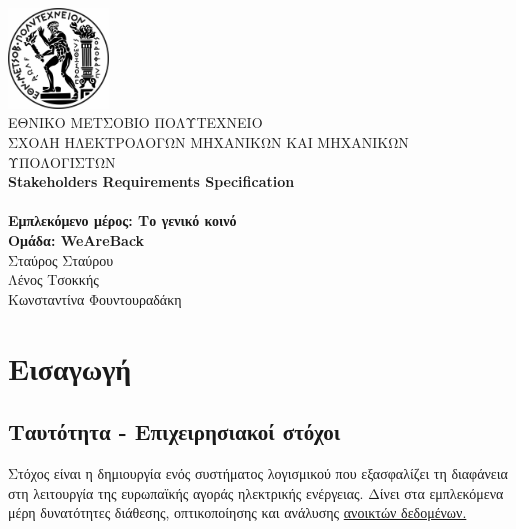 \documentclass[a4paper,12pt, oneside]{article}
\begin{document}
\begin{titlepage}
\begin{center}

\includegraphics[width=0.20\textwidth]{./img/NTUAlogo.jpg}~\\[0.1cm]
\textsc{ ΕΘΝΙΚΟ ΜΕΤΣΟΒΙΟ ΠΟΛΥΤΕΧΝΕΙΟ}\\[0.2cm]  
\textsc{ ΣΧΟΛΗ ΗΛΕΚΤΡΟΛΟΓΩΝ ΜΗΧΑΝΙΚΩΝ ΚΑΙ ΜΗΧΑΝΙΚΩΝ ΥΠΟΛΟΓΙΣΤΩΝ}\\[3cm] 


\textbf{\LARGE \textlatin{Stakeholders Requirements Specification}}\\[0.01cm]
\\[2cm]

\textbf{\Large Εμπλεκόμενο μέρος: Το γενικό κοινό}\\[2cm]

\textbf{Ομάδα:  \textlatin{WeAreBack}}\\
	Σταύρος Σταύρου \\
	Λένος Τσοκκής \\ 
	Κωνσταντίνα Φουντουραδάκη
\vfill

\end{center} 
\end{titlepage}

\thispagestyle{empty}
\newpage

\thispagestyle{empty}
\setcounter{page}{2}
\tableofcontents
\newpage


\section{Εισαγωγή}
\subsection{Ταυτότητα - Επιχειρησιακοί στόχοι}
Στόχος είναι η δημιουργία ενός συστήματος λογισμικού που εξασφαλίζει τη διαφάνεια στη λειτουργία της ευρωπαϊκής αγοράς ηλεκτρικής ενέργειας. Δίνει στα εμπλεκόμενα μέρη δυνατότητες διάθεσης, οπτικοποίησης και ανάλυσης \href{https://transparency.entsoe.eu}{ανοικτών δεδομένων.}
\end{document}
